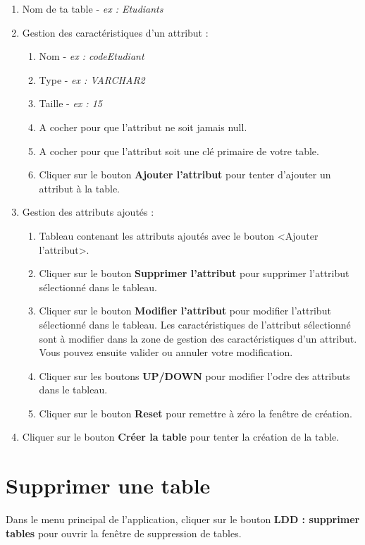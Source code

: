 \begin{enumerate}
\item Nom de ta table - \textit{ex : Etudiants}

\item Gestion des caractéristiques d'un attribut :
\begin{enumerate}
\item Nom - \textit{ex : codeEtudiant}
\item Type - \textit{ex : VARCHAR2}
\item Taille - \textit{ex : 15}
\item A cocher pour que l'attribut ne soit jamais null.
\item A cocher pour que l'attribut soit une clé primaire de votre table.
\item Cliquer sur le bouton \textbf{Ajouter l'attribut} pour tenter d'ajouter un attribut à la table.
\end{enumerate}

\item Gestion des attributs ajoutés :
\begin{enumerate}
\item Tableau contenant les attributs ajoutés avec le bouton <Ajouter l'attribut>.
\item Cliquer sur le bouton \textbf{Supprimer l'attribut} pour supprimer l'attribut sélectionné dans le tableau.
\item Cliquer sur le bouton \textbf{Modifier l'attribut} pour modifier l'attribut sélectionné dans le tableau. 
Les caractéristiques de l'attribut sélectionné sont à modifier dans la zone de gestion des caractéristiques d'un attribut. 
Vous pouvez ensuite valider ou annuler votre modification.
\item Cliquer sur les boutons \textbf{UP/DOWN} pour modifier l'odre des attributs dans le tableau. 
\item Cliquer sur le bouton \textbf{Reset} pour remettre à zéro la fen\^etre de création.
\end{enumerate}

\item Cliquer sur le bouton \textbf{Créer la table} pour tenter la création de la table.
\end{enumerate}

\section{Supprimer une table}
Dans le menu principal de l'application, cliquer sur le bouton \textbf{LDD : supprimer tables} pour ouvrir la fen\^etre de suppression de tables.

